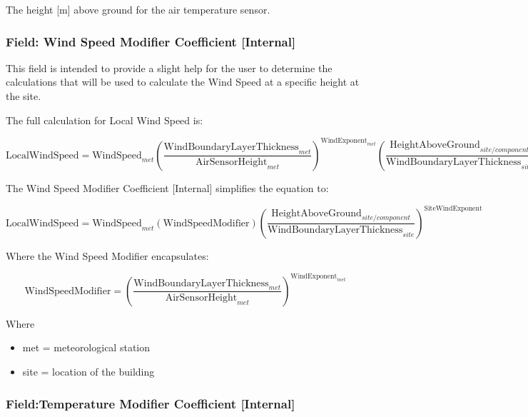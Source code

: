 The height {[}m{]} above ground for the air temperature sensor.

\subsubsection{Field: Wind Speed Modifier Coefficient {[}Internal{]}}\label{field-wind-speed-modifier-coefficient-internal}

This field is intended to provide a slight help for the user to determine the calculations that will be used to calculate the Wind Speed at a specific height at the site.

The full calculation for Local Wind Speed is:

\begin{equation}
\text{LocalWindSpeed} = \text{WindSpeed}_{met} \left( \frac{\text{WindBoundaryLayerThickness}_{met}}{\text{AirSensorHeight}_{met}} \right)^{\text{WindExponent}_{met}} \left(\frac{\text{HeightAboveGround}_{site/component}}{\text{WindBoundaryLayerThickness}_{site}}\right)^{\text{SiteWindExponent}}
\end{equation}

The Wind Speed Modifier Coefficient {[}Internal{]} simplifies the equation to:

\begin{equation}
\text{LocalWindSpeed} = \text{WindSpeed}_{met} \left( \text{WindSpeedModifier} \right) \left(\frac{\text{HeightAboveGround}_{site/component}}{\text{WindBoundaryLayerThickness}_{site}}\right)^{\text{SiteWindExponent}}
\end{equation}

Where the Wind Speed Modifier encapsulates:

\begin{equation}
\text{WindSpeedModifier} = \left( \frac{\text{WindBoundaryLayerThickness}_{met}}{\text{AirSensorHeight}_{met}} \right)^{\text{WindExponent}_{met}}
\end{equation}

Where

\begin{itemize}
\tightlist
\item
  met = meteorological station
\item
  site = location of the building
\end{itemize}

\subsubsection{Field:Temperature Modifier Coefficient {[}Internal{]}}\label{fieldtemperature-modifier-coefficient-internal}

